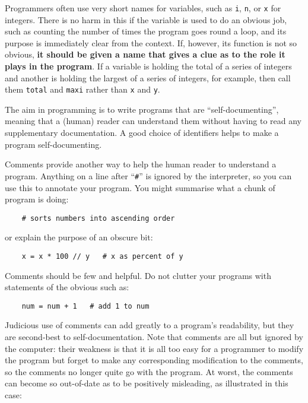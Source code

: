 Programmers often use very short names for variables, such as
\verb!i!, \verb!n!, or 
\verb!x! for integers.  There is no harm in this if the variable is used to
do an obvious job, such as counting the number of times the program goes round
a loop, and its purpose is immediately clear from the context.  If, however, its
function is not so obvious, \textbf{it should be given a name that
gives a clue as to the role it plays in the program}.  If a variable is
holding the total of a series of integers and another is holding the
largest of a series of integers, for example, then call them \verb!total!
and \verb!maxi! rather than \verb!x! and \verb!y!.

The aim in programming is to write programs that are ``self-documenting'',
meaning that a (human) reader can understand them without having to read
any supplementary documentation.  A good choice of identifiers helps to
make a program self-documenting.

Comments provide another way to help the human reader to understand a
program.  Anything on a line after ``\texttt{\#}'' is ignored by the interpreter,
so you can use this to annotate your program.  You might summarise
what a chunk of program is doing:

\begin{Verbatim}
    # sorts numbers into ascending order
\end{Verbatim}

or explain the purpose of an obscure bit:

\begin{Verbatim}
    x = x * 100 // y   # x as percent of y
\end{Verbatim}

Comments should be few and helpful.  Do not clutter your programs with
statements of the obvious such as:

\begin{Verbatim}
    num = num + 1   # add 1 to num
\end{Verbatim}

Judicious use of comments can add greatly to a program's readability, but they
are second-best to self-documentation. Note that comments are all but
ignored by the computer: their weakness is that it is all too
easy for a programmer to modify the program but forget to make any
corresponding modification to the comments, so the comments no longer quite
go with the program. At worst, the comments can become so out-of-date as
to be positively misleading, as illustrated in this case: 


